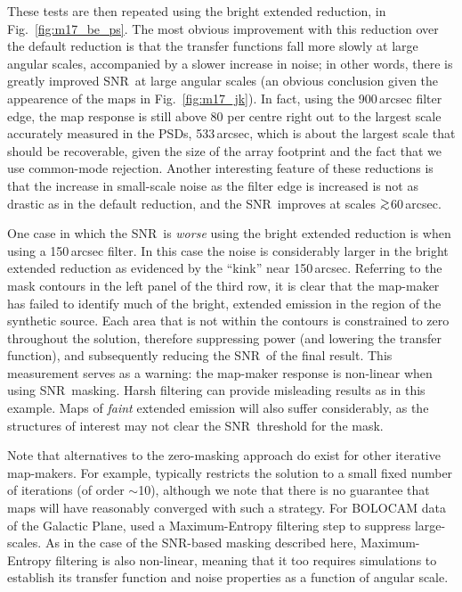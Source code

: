 \documentclass[useAMS,usenatbib,nofootinbib]{mn2e}
\newcommand{\snr}{SNR}
\def\gsim{\mathrel{\lower2.5pt\vbox{\lineskip=0pt\baselineskip=0pt
          \hbox{$>$}\hbox{$\sim$}}}}
\begin{document}
These tests are then repeated using the bright extended reduction, in
Fig.~\ref{fig:m17_be_ps}. The most obvious improvement with this
reduction over the default reduction is that the transfer functions
fall more slowly at large angular scales, accompanied by a slower
increase in noise; in other words, there is greatly improved \snr\ at
large angular scales (an obvious conclusion given the appearence of
the maps in Fig.~\ref{fig:m17_jk}). In fact, using the 900\,arcsec
filter edge, the map response is still above 80 per centre right out to
the largest scale accurately measured in the PSDs, 533\,arcsec, which
is about the largest scale that should be recoverable, given the size
of the array footprint and the fact that we use common-mode rejection.
Another interesting feature of these reductions is that the increase
in small-scale noise as the filter edge is increased is not as drastic
as in the default reduction, and the \snr\ improves at scales
$\gsim$60\,arcsec.

One case in which the \snr\ is \emph{worse} using the bright extended
reduction is when using a 150\,arcsec filter. In this case the noise
is considerably larger in the bright extended reduction as evidenced
by the ``kink'' near 150\,arcsec. Referring to the mask contours in
the left panel of the third row, it is clear that the map-maker has
failed to identify much of the bright, extended emission in the region
of the synthetic source. Each area that is not within the contours is
constrained to zero throughout the solution, therefore suppressing
power (and lowering the transfer function), and subsequently reducing
the \snr\ of the final result. This measurement serves as a warning:
the map-maker response is non-linear when using \snr\ masking. Harsh
filtering can provide misleading results as in this example. Maps of
\emph{faint} extended emission will also suffer considerably, as the
structures of interest may not clear the \snr\ threshold for the mask.

Note that alternatives to the zero-masking approach do exist for other
iterative map-makers. For example, \citet{kovacs2008} typically
restricts the solution to a small fixed number of iterations (of order
$\sim$10), although we note that there is no guarantee that maps will
have reasonably converged with such a strategy. For BOLOCAM data of
the Galactic Plane, \citet{aguirre2010} used a Maximum-Entropy
filtering step to suppress large-scales. As in the case of the
\snr-based masking described here, Maximum-Entropy filtering is also
non-linear, meaning that it too requires simulations to establish its
transfer function and noise properties as a function of angular scale.
\end{document}
